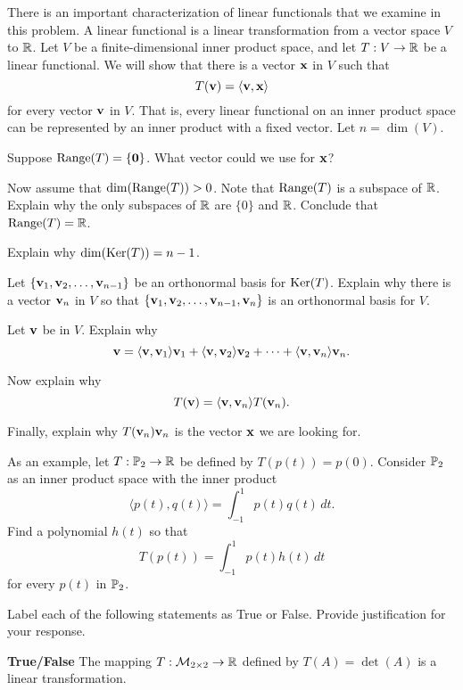 \item There is an important characterization of linear functionals that we examine in this problem. A linear functional is a linear transformation from a vector space $V$ to $\mathbb{R}$. Let $V$ be a finite-dimensional inner product space, and let $T: V \to \mathbb{R}$ be a linear functional. We will show that there is a vector $\mathbf{x}$ in $V$ such that 
\[T(\mathbf{v}) = \langle \mathbf{v}, \mathbf{x} \rangle\]
for every vector $\mathbf{v}$ in $V$. That is, every linear functional on an inner product space can be represented by an inner product with a fixed vector. Let $n = \dim(V)$. 
 
 \ba
 \item Suppose $\text{Range}(T) = \{\mathbf{0}\}$. What vector could we use for $\mathbf{x}$?
 
 \item Now assume that $\dim(\text{Range}(T)) > 0$. Note that $\text{Range}(T)$ is a subspace of $\mathbb{R}$. Explain why the only subspaces of $\mathbb{R}$ are $\{0\}$ and $\mathbb{R}$. Conclude that $\text{Range}(T) = \mathbb{R}$. 
 
\item Explain why $\dim(\text{Ker}(T)) = n-1$. 

 
 \item Let $\{\mathbf{v}_1, \mathbf{v}_2, \ldots, \mathbf{v}_{n-1}\}$ be an orthonormal basis for $\text{Ker}(T)$. Explain why there is a vector $\mathbf{v}_n$ in $V$ so that $\{\mathbf{v}_1, \mathbf{v}_2, \ldots, \mathbf{v}_{n-1}, \mathbf{v}_n\}$ is an orthonormal basis for $V$.
 
 \item Let $\mathbf{v}$ be in $V$. Explain why 
 \[\mathbf{v} = \langle \mathbf{v}, \mathbf{v}_1 \rangle \mathbf{v}_1 + \langle \mathbf{v}, \mathbf{v}_2 \rangle \mathbf{v}_2 + \cdots + \langle \mathbf{v}, \mathbf{v}_n \rangle \mathbf{v}_n.\]
 
\item Now explain why 
\[T(\mathbf{v}) = \langle \mathbf{v}, \mathbf{v}_n \rangle T(\mathbf{v}_n).\]
 
 \item Finally, explain why $T(\mathbf{v}_n)\mathbf{v}_n$ is the vector $\mathbf{x}$ we are looking for.
 
 \item As an example, let $T: \mathbb{P}_2 \to \mathbb{R}$ be defined by $T(p(t)) = p(0)$. Consider $\mathbb{P}_2$ as an inner product space with the inner product
 \[\langle p(t), q(t) \rangle = \int_{-1}^1 p(t)q(t) \, dt.\]
 Find a polynomial $h(t)$ so that 
 \[T(p(t)) = \int_{-1}^1 p(t)h(t) \, dt \]
 for every $p(t)$ in $\mathbb{P}_2$. 

 \ea
	
 \item Label each of the following statements as True or False. Provide justification for your response.
	\ba
\item \textbf{True/False} The mapping $T: \mathcal{M}_{2 \times 2} \to \mathbb{R}$ defined by $T(A) = \det(A)$ is a linear transformation. 
	
